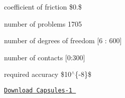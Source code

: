 


\begin{DoxyItemize}
\item coefficient of friction \$0.\$  
\item number of problems 1705  
\item number of degrees of freedom \mbox{[}6 \+: 600\mbox{]}  
\item number of contacts \mbox{[}0\+:300\mbox{]}  
\item required accuracy \$10$^\wedge$\{-\/8\}\$  
\end{DoxyItemize}

\href{./resources/KaplasTower-1.tar.gz}{\tt Download Capsules-\/1 } 